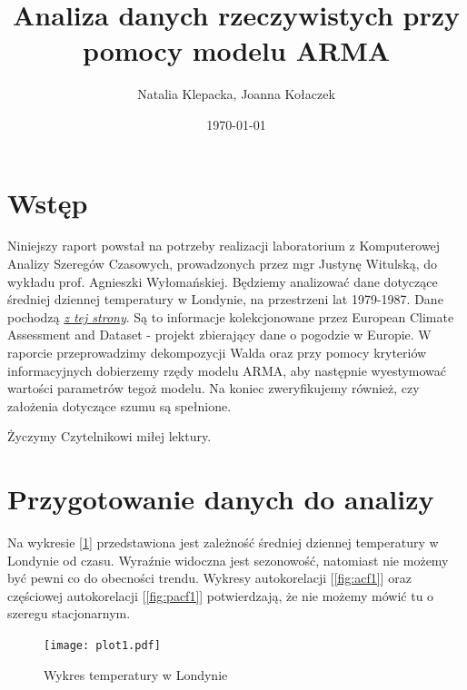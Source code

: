 \documentclass{article}
\title{Analiza danych rzeczywistych przy pomocy modelu ARMA}
\author{Natalia Klepacka, Joanna Kołaczek}
\date{\today}
\theoremstyle{break}
\begin{document}
	\maketitle
	\tableofcontents
	\clearpage
	\section{Wstęp}
	Niniejszy raport powstał na potrzeby realizacji laboratorium z Komputerowej Analizy Szeregów Czasowych, prowadzonych przez mgr Justynę Witulską, do wykładu prof. Agnieszki Wyłomańskiej.
	Będziemy analizować dane dotyczące średniej dziennej temperatury w Londynie, na przestrzeni lat 1979-1987. Dane pochodzą \href{https://www.kaggle.com/datasets/emmanuelfwerr/london-weather-data }{\textit{z tej strony}}. Są to informacje kolekcjonowane przez European Climate Assessment and Dataset - projekt zbierający dane o pogodzie w Europie.
	W raporcie przeprowadzimy dekompozycji Walda oraz przy pomocy kryteriów informacyjnych dobierzemy rzędy modelu ARMA, aby następnie wyestymować wartości parametrów tegoż modelu. Na koniec zweryfikujemy również, czy założenia dotyczące szumu są spełnione.

Życzymy Czytelnikowi miłej lektury.

\section{Przygotowanie danych do analizy}

Na wykresie [\ref{fig:p1}] przedstawiona jest zależność średniej dziennej temperatury w Londynie od czasu. Wyraźnie widoczna jest sezonowość, natomiast nie możemy być pewni co do obecności trendu. Wykresy autokorelacji [\ref{fig:acf1}] oraz częściowej autokorelacji [\ref{fig:pacf1}] potwierdzają, że nie możemy mówić tu o szeregu stacjonarnym.

\begin{figure}[H]
	\begin{center}
		\texttt{[image: plot1.pdf]}
		\caption{Wykres temperatury w Londynie}
		\label{fig:p1}
	\end{center}
\end{figure}
\end{document}
